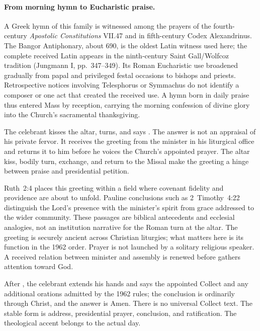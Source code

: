 \paragraph{From morning hymn to Eucharistic praise.}
A Greek hymn of this family is witnessed among the prayers of the fourth-century \emph{Apostolic Constitutions} VII.47 and in fifth-century Codex Alexandrinus. The Bangor Antiphonary, about 690, is the oldest Latin witness used here; the complete received Latin appears in the ninth-century Saint Gall/Wolfcoz tradition (Jungmann I, pp.~347--349). Its Roman Eucharistic use broadened gradually from papal and privileged festal occasions to bishops and priests. Retrospective notices involving Telesphorus or Symmachus do not identify a composer or one act that created the received use. A hymn born in daily praise thus entered Mass by reception, carrying the morning confession of divine glory into the Church's sacramental thanksgiving.


The celebrant kisses the altar, turns, and says . The answer  is not an appraisal of his private fervor. It receives the greeting from the minister in his liturgical office and returns it to him before he voices the Church's appointed prayer. The altar kiss, bodily turn, exchange, and return to the Missal make the greeting a hinge between praise and presidential petition.

Ruth~2:4 places this greeting within a field where covenant fidelity and providence are about to unfold. Pauline conclusions such as 2~Timothy~4:22 distinguish the Lord's presence with the minister's spirit from grace addressed to the wider community. These passages are biblical antecedents and ecclesial analogies, not an institution narrative for the Roman turn at the altar. The greeting is securely ancient across Christian liturgies; what matters here is its function in the 1962 order. Prayer is not launched by a solitary religious speaker. A received relation between minister and assembly is renewed before  gathers attention toward God.


After , the celebrant extends his hands and says the appointed Collect and any additional orations admitted by the 1962 rules; the conclusion is ordinarily through Christ, and the answer is Amen. There is no universal Collect text. The stable form is address, presidential prayer, conclusion, and ratification. The theological accent belongs to the actual day.

